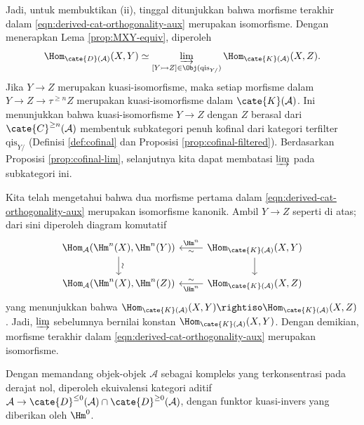 \begin{bukti}
	Jadi, untuk membuktikan (ii), tinggal ditunjukkan bahwa morfisme terakhir dalam
	\eqref{eqn:derived-cat-orthogonality-aux} merupakan isomorfisme. Dengan
	menerapkan Lema \ref{prop:MXY-equiv}, diperoleh
	\[ \Hom_{\cate{D}(\mathcal{A})}(X, Y) \simeq \varinjlim_{[Y \rightarrowtail Z] \in \Obj(\mathrm{qis}_{Y/}) } \Hom_{\cate{K}(\mathcal{A})}(X, Z). \]
	Jika $Y \to Z$ merupakan kuasi-isomorfisme, maka setiap morfisme dalam
	$Y \to Z \to \tau^{\geq n} Z$ merupakan kuasi-isomorfisme dalam
	$\cate{K}(\mathcal{A})$. Ini menunjukkan bahwa kuasi-isomorfisme $Y \to Z$
	dengan $Z$ berasal dari $\cate{C}^{\geq n}(\mathcal{A})$ membentuk
	subkategori penuh kofinal dari kategori terfilter $\mathrm{qis}_{Y/}$
	(Definisi \ref{def:cofinal} dan Proposisi \ref{prop:cofinal-filtered}).
	Berdasarkan Proposisi \ref{prop:cofinal-lim}, selanjutnya kita dapat membatasi
	$\varinjlim$ pada subkategori ini.
	
	Kita telah mengetahui bahwa dua morfisme pertama dalam
	\eqref{eqn:derived-cat-orthogonality-aux} merupakan isomorfisme kanonik.
	Ambil $Y \to Z$ seperti di atas; dari sini diperoleh diagram komutatif
	\[\begin{tikzcd}
		\Hom_{\mathcal{A}}(\Hm^n(X), \Hm^n(Y)) \arrow[d, "\sim" sloped] & \Hom_{\cate{K}(\mathcal{A})}(X, Y) \arrow[l, "\sim", "{\Hm^n}"'] \arrow[d] \\
		\Hom_{\mathcal{A}}(\Hm^n(X), \Hm^n(Z)) & \Hom_{\cate{K}(\mathcal{A})}(X, Z) \arrow[l, "\sim"', "{\Hm^n}"]
	\end{tikzcd}\]
	yang menunjukkan bahwa
	$\Hom_{\cate{K}(\mathcal{A})}(X, Y) \rightiso
	\Hom_{\cate{K}(\mathcal{A})}(X, Z)$. Jadi, $\varinjlim$ sebelumnya bernilai
	konstan $\Hom_{\cate{K}(\mathcal{A})}(X, Y)$. Dengan demikian, morfisme
	terakhir dalam \eqref{eqn:derived-cat-orthogonality-aux} merupakan isomorfisme.
\end{bukti}

\begin{teorema}\label{prop:derived-cat-embedding}
	Dengan memandang objek-objek $\mathcal{A}$ sebagai kompleks yang terkonsentrasi
	pada derajat nol, diperoleh ekuivalensi kategori aditif
	$\mathcal{A} \to \cate{D}^{\leq 0}(\mathcal{A}) \cap
	\cate{D}^{\geq 0}(\mathcal{A})$, dengan funktor kuasi-invers yang diberikan
	oleh $\Hm^0$.
\end{teorema}

